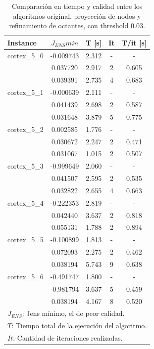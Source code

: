  
\begin{table}[H]
	\centering
	\begin{tabular}{|l|c|c|c|c|}
		\hline
		Instance & $J_{ENS}min$ & T [s] & It & T/it [s] \\ \hline
			cortex\_5\_0 & -0.009743 & 2.312 & - & - \\
			&  0.037720 & 2.917 & 2 & 0.605 \\
			&  0.039391 & 2.735 & 4 & 0.683 \\
		\hline
			cortex\_5\_1 & -0.000639 & 2.111 & - & - \\
			& 0.041439 & 2.698 & 2 & 0.587 \\ 
			& 0.031648 & 3.879 & 5 & 0.775 \\
		\hline
			cortex\_5\_2 & 0.002585 & 1.776 & - & - \\
			& 0.030672 & 2.247 & 2 & 0.471 \\ 
			& 0.031067 & 1.015 & 2 & 0.507 \\
		\hline
			cortex\_5\_3 & -0.999649 & 2.060 & - & - \\
			& 0.041507 & 2.595 & 2 & 0.535 \\ 
			& 0.032822 & 2.655 & 4 & 0.663 \\
		\hline
			cortex\_5\_4 & -0.222353 & 2.819 & - & - \\
			& 0.042440 & 3.637 & 2 & 0.818 \\ 
			& 0.055131 & 1.788 & 2 & 0.894 \\
		\hline
			cortex\_5\_5 & -0.100899 & 1.813 & - & - \\
			& 0.072093 & 2.275 & 2 & 0.462 \\ 
			& 0.038194 & 5.743 & 9 & 0.638 \\
		\hline
			cortex\_5\_6 & -0.491747 & 1.800 & - & - \\
			& -0.981794 & 3.637 & 5 & 0.459 \\ 
			& 0.038194 & 4.167 & 8 & 0.520 \\
		\hline
		\multicolumn{5}{l}{ $J_{ENS}$: Jens mínimo, el \element{} de peor calidad.} \\
		\multicolumn{5}{l}{ $T$: Tiempo total de la ejecución del algoritmo.} \\
		\multicolumn{5}{l}{ $It$: Cantidad de iteraciones realizadas.}
	\end{tabular}
	\caption{Comparación en tiempo y calidad entre los algoritmos original, proyección de nodos y refinamiento de octantes, con threshold $0.03$.}
	\label{table:cortex_qt}
\end{table}

